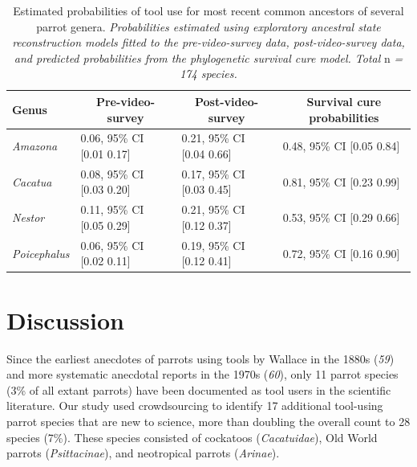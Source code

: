 \documentclass[
  man,floatsintext]{apa6}
\begin{document}
\begin{table}[tbp]

\begin{center}
\begin{threeparttable}

\caption{\label{tab:tableASR}Estimated probabilities of tool use for most recent common
ancestors of several parrot genera. \emph{Probabilities estimated using exploratory
ancestral state reconstruction models fitted to the pre-video-survey data,
post-video-survey data, and predicted probabilities from the phylogenetic
survival cure model. Total} n \emph{= 174 species.}}

\begin{tabular}{llll}
\toprule
Genus & \multicolumn{1}{c}{Pre-video-survey} & \multicolumn{1}{c}{Post-video-survey} & \multicolumn{1}{c}{Survival cure probabilities}\\
\midrule
\textit{Amazona} & 0.06, 95\% CI [0.01 0.17] & 0.21, 95\% CI [0.04 0.66] & 0.48, 95\% CI [0.05 0.84]\\
\textit{Cacatua} & 0.08, 95\% CI [0.03 0.20] & 0.17, 95\% CI [0.03 0.45] & 0.81, 95\% CI [0.23 0.99]\\
\textit{Nestor} & 0.11, 95\% CI [0.05 0.29] & 0.21, 95\% CI [0.12 0.37] & 0.53, 95\% CI [0.29 0.66]\\
\textit{Poicephalus} & 0.06, 95\% CI [0.02 0.11] & 0.19, 95\% CI [0.12 0.41] & 0.72, 95\% CI [0.16 0.90]\\
\bottomrule
\end{tabular}

\end{threeparttable}
\end{center}

\end{table}

\hypertarget{discussion}{%
\section{Discussion}\label{discussion}}

Since the earliest anecdotes of parrots using tools by Wallace in the 1880s
(\emph{59}) and more systematic anecdotal reports in the 1970s (\emph{60}),
only 11 parrot species (3\% of all extant parrots) have been documented as tool
users in the scientific literature. Our study used crowdsourcing to identify 17
additional tool-using parrot species that are new to science, more than doubling
the overall count to 28 species (7\%). These species consisted of cockatoos
(\emph{Cacatuidae}), Old World parrots (\emph{Psittacinae}), and neotropical parrots
(\emph{Arinae}).
\end{document}
